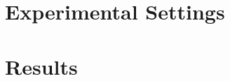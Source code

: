 \documentclass{article}
\begin{document}
%
%

\glsresetall





\section{Experimental Settings}
\label{sec:experiments}


\section{Results}
\label{sec:results}

\end{document}
